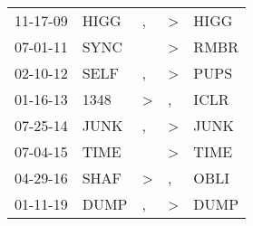\begin{supertabular}{p{0.07\textwidth}p{0.06\textwidth}p{0.02\textwidth}p{0.02\textwidth}p{0.06\textwidth}}
          11-17-09\textsuperscript{} &           HIGG\textsuperscript{} &                , &     \textgreater &           HIGG\textsuperscript{} \\
          07-01-11\textsuperscript{} &           SYNC\textsuperscript{} &                  &     \textgreater &           RMBR\textsuperscript{} \\
          02-10-12\textsuperscript{} &           SELF\textsuperscript{} &                , &     \textgreater &           PUPS\textsuperscript{} \\
          01-16-13\textsuperscript{} &           1348\textsuperscript{} &     \textgreater &                , &           ICLR\textsuperscript{} \\
          07-25-14\textsuperscript{} &           JUNK\textsuperscript{} &                , &     \textgreater &           JUNK\textsuperscript{} \\
          07-04-15\textsuperscript{} &           TIME\textsuperscript{} &                  &     \textgreater &           TIME\textsuperscript{} \\
          04-29-16\textsuperscript{} &           SHAF\textsuperscript{} &     \textgreater &                , &           OBLI\textsuperscript{} \\
          01-11-19\textsuperscript{} &           DUMP\textsuperscript{} &                , &     \textgreater &           DUMP\textsuperscript{} \\
\end{supertabular}
